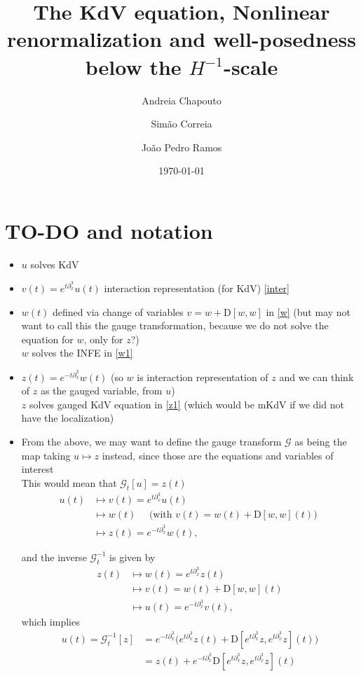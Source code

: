 \documentclass[%
11pt,  reqno]{amsart}
\title[Renormalization of KdV]{The KdV equation, Nonlinear renormalization  and well-posedness below the $H^{-1}$-scale}
\author[A.~Chapouto \and S.~Correia \and J.~P.~Ramos]
{Andreia Chapouto \and Sim\~ao Correia \and Jo\~ao Pedro Ramos}
\date{\today}
\newcommand{\5}{\textup{V}}
\newcommand{\dx}{\partial_x}
\theoremstyle{remark}
\newcommand{\Gc}{\mathcal{G}}
\numberwithin{equation}{section}
\numberwithin{theorem}{section}
\newcommand{\D}{\mathrm{D}}
\begin{document}
	
	\maketitle
	
	
	
	
	\tableofcontents
	



    \newpage

    \section{TO-DO and notation}

    \begin{itemize}
    \item $u$ solves KdV


    \item $v(t) = e^{t\dx^3} u(t)$ interaction representation (for KdV) \eqref{inter}

    \item $w(t)$ defined via change of variables $v = w + \D[w,w]$ in \eqref{w} (but may not want to call this the gauge transformation, because we do not solve the equation for $w$, only for $z$?)
\\
$w$ solves the INFE in \eqref{w1} 

    \item $z(t) = e^{-t\dx^3} w(t)$ (so $w$ is interaction representation of $z$ and we can think of $z$ as the gauged variable, from $u$)
    \\
    $z$ solves gauged KdV equation in \eqref{z1} (which would be mKdV if we did not have the localization)

    \item From the above, we may want to define the gauge transform $\Gc$  as being the map taking $u\mapsto z$ instead, since those are the equations and variables of interest 
    \\
    This would mean that $\Gc_t[u] = z(t)$
    \begin{align}
        u(t) & \mapsto v(t) = e^{t\dx^3} u(t) 
        \\
        &
        \mapsto w(t) \quad \text{ (with $v(t) = w(t) + \D[w,w](t)$) } 
        \\
        &\mapsto z(t) = e^{-t\dx^3} w(t), 
    \end{align}
    
    and the inverse $\Gc_t^{-1}$ is given by
    \begin{align}
    z(t) & \mapsto w(t) = e^{t\dx^3} z(t)
    \\
    &\mapsto v(t) = w(t) + \D[w,w](t)
    \\
    &
    \mapsto 
    u(t) = e^{-t\dx^3} v(t), 
    \end{align}
    which implies
    \begin{align}
    u(t) = \Gc_t^{-1}[z] 
    &
    = e^{-t\dx^3} \big( e^{t\dx^3} z(t) + \D[e^{t\dx^3} z, e^{t\dx^3} z ](t) \big)
    \\
    &
    = z(t) + e^{-t\dx^3}\D[e^{t\dx^3} z, e^{t\dx^3} z ](t) 
    \end{align}



\end{itemize}
\end{document}
